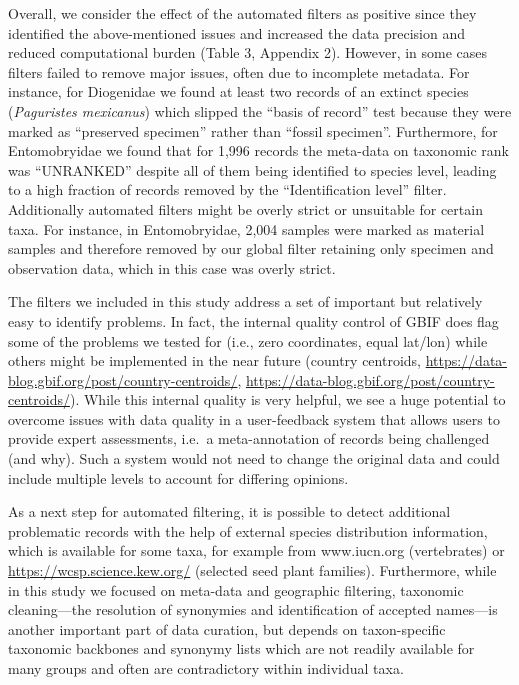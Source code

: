 \documentclass[fleqn,10pt,lineno]{wlpeerj} %
\begin{document}
Overall, we consider the effect of the automated filters as positive since they identified the above-mentioned issues and increased the data precision and reduced computational burden (Table 3, Appendix 2). However, in some cases filters failed to remove major issues, often due to incomplete metadata. For instance, for Diogenidae we found at least two records of an extinct species (\emph{Paguristes mexicanus}) which slipped the ``basis of record'' test because they were marked as ``preserved specimen'' rather than ``fossil specimen''. Furthermore, for Entomobryidae we found that for 1,996 records the meta-data on taxonomic rank was ``UNRANKED'' despite all of them being identified to species level, leading to a high fraction of records removed by the ``Identification level'' filter. Additionally automated filters might be overly strict or unsuitable for certain taxa. For instance, in Entomobryidae, 2,004 samples were marked as material samples and therefore removed by our global filter retaining only specimen and observation data, which in this case was overly strict.

The filters we included in this study address a set of important but relatively easy to identify problems. In fact, the internal quality control of GBIF does flag some of the problems we tested for (i.e., zero coordinates, equal lat/lon) while others might be implemented in the near future (country centroids, \url{https://data-blog.gbif.org/post/country-centroids/}, \url{https://data-blog.gbif.org/post/country-centroids/}). While this internal quality is very helpful, we see a huge potential to overcome issues with data quality in a user-feedback system that allows users to provide expert assessments, i.e.~a meta-annotation of records being challenged (and why). Such a system would not need to change the original data and could include multiple levels to account for differing opinions.

As a next step for automated filtering, it is possible to detect additional problematic records with the help of external species distribution information, which is available for some taxa, for example from www.iucn.org (vertebrates) or \url{https://wcsp.science.kew.org/} (selected seed plant families). Furthermore, while in this study we focused on meta-data and geographic filtering, taxonomic cleaning---the resolution of synonymies and identification of accepted names---is another important part of data curation, but depends on taxon-specific taxonomic backbones and synonymy lists which are not readily available for many groups and often are contradictory within individual taxa.
\end{document}
